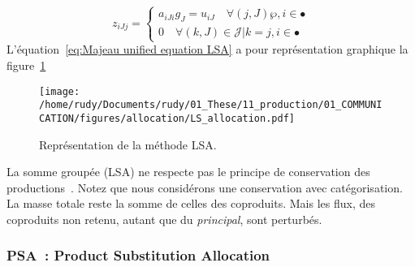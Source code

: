 \begin{equation}
 z_{iJj}=
 \begin{cases} a_{iJi}g_{J} = u_{iJ} \quad \forall(j,J)\wp,i\in \bullet 
 \\
 0 \quad \forall(k,J)\in \mathcal{J}|k = j,i\in \bullet
 \end{cases}
 \label{eq:Majeau unified equation LSA}
\end{equation}
L'équation~\ref{eq:Majeau unified equation LSA} a pour représentation graphique la figure~\ref{fig:Lump-Sum}
\begin{figure}[htbp]
\texttt{[image: /home/rudy/Documents/rudy/01\_These/11\_production/01\_COMMUNICATION/figures/allocation/LS\_allocation.pdf]}
\caption{Représentation de la méthode LSA.}
\label{fig:Lump-Sum}
\end{figure}




La somme groupée (LSA) ne respecte pas le principe de conservation des productions~\cite{majeau-bettez_unified_2014}.
Notez que nous considérons une conservation avec catégorisation.
La masse totale reste la somme de celles des coproduits.
Mais les flux, des coproduits non retenu, autant que du \textit{principal}, sont perturbés.

\subsubsection{PSA~: Product Substitution Allocation}


